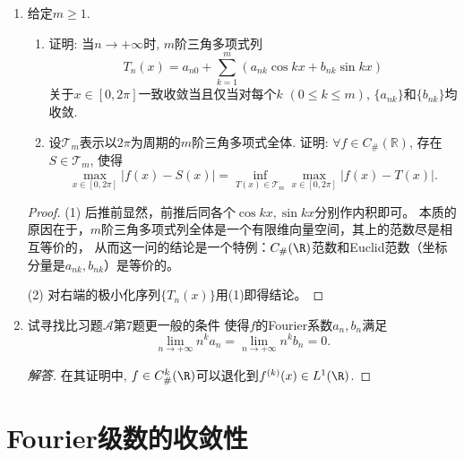 \begin{quizb}
\begin{enumerate}
\item 给定\(m\geqslant 1\).\begin{enumerate}[label=(\arabic*)]
\item 证明: 当\(n\rightarrow +\infty\)时, \(m\)阶三角多项式列
\[T_n(x)=a_{n0}+\sum_{k=1}^{m}\left(a_{nk}\cos kx+b_{nk}\sin kx\right)\]
关于\(x\in[0,2\pi]\)一致收敛当且仅当对每个\(k\) \((0\leqslant k\leqslant m)\), \(\{a_{nk}\}\)和\(\{b_{nk}\}\)均收敛.
\item 设\(\mathcal{T}_m\)表示以\(2\pi\)为周期的\(m\)阶三角多项式全体. 
证明: \(\forall f\in C_{\#}(\mathbb{R})\), 存在\(S\in\mathcal{T}_m\), 
使得\[\max_{x\in [0,2\pi]}\left|f(x)-S(x)\right|
=\inf_{T(x)\in\mathcal{T}_m}\max_{x\in[0,2\pi]}\left|f(x)-T(x)\right|.\]
\end{enumerate}
\begin{proof}
(1) 后推前显然，前推后同各个$\cos kx,\sin kx$分别作内积即可。
本质的原因在于，$m$阶三角多项式列全体是一个有限维向量空间，其上的范数尽是相互等价的，
从而这一问的结论是一个特例：$C_{\#}(\R)$范数和Euclid范数（坐标分量是$a_{nk},b_{nk}$）是等价的。

(2) 对右端的极小化序列$\{T_n(x)\}$用(1)即得结论。
\end{proof}
\item 试寻找比习题\(\boldsymbol{\mathcal{A}}\)第7题更一般的条件
使得\(f\)的Fourier系数\(a_n,b_n\)满足
\[\lim_{n\rightarrow+\infty}n^ka_n=\lim_{n\rightarrow+\infty}n^kb_n=0.\]
\begin{proof}[解答]
在其证明中, \(f\in C_{\#}^k(\R)\)可以退化到\(f^{(k)}(x)\in L^1(\R)\).
\end{proof}
\end{enumerate}
\end{quizb}

\section{Fourier级数的收敛性}
